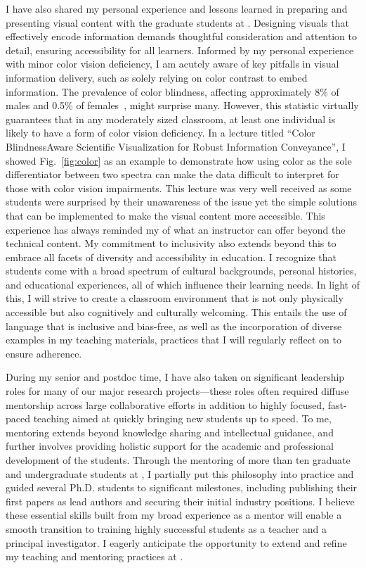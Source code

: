 I have also shared my personal experience and lessons learned in preparing and presenting visual content with the graduate students at \mySchoolShort{}. Designing visuals that effectively encode information demands thoughtful consideration and attention to detail, ensuring accessibility for all learners. Informed by my personal experience with minor color vision deficiency, I am acutely aware of key pitfalls in visual information delivery, such as solely relying on color contrast to embed information. The prevalence of color blindness, affecting approximately 8\% of males and 0.5\% of females~\cite{TypesColourBlindness}, might surprise many. However, this statistic virtually guarantees that in any moderately sized classroom, at least one individual is likely to have a form of color vision deficiency. In a lecture titled ``Color Blindness\textendash{}Aware Scientific Visualization for Robust Information Conveyance'', I showed Fig.~\ref{fig:color} as an example to demonstrate how using color as the sole differentiator between two spectra can make the data difficult to interpret for those with color vision impairments. This lecture was very well received as some students were surprised by their unawareness of the issue yet the simple solutions that can be implemented to make the visual content more accessible. This experience has always reminded my of what an instructor can offer beyond the technical content. My commitment to inclusivity also extends beyond this to embrace all facets of diversity and accessibility in education. I recognize that students come with a broad spectrum of cultural backgrounds, personal histories, and educational experiences, all of which influence their learning needs. In light of this, I will strive to create a classroom environment that is not only physically accessible but also cognitively and culturally welcoming. This entails the use of language that is inclusive and bias-free, as well as the incorporation of diverse examples in my teaching materials, practices that I will regularly reflect on to ensure adherence.

During my senior \myDegree{} and postdoc time, I have also taken on significant leadership roles for many of our major research projects—these roles often required diffuse mentorship across large collaborative efforts in addition to highly focused, fast-paced teaching aimed at quickly bringing new students up to speed. To me, mentoring extends beyond knowledge sharing and intellectual guidance, and further involves providing holistic support for
the academic and professional development of the students. Through the mentoring of more than ten graduate and undergraduate students at \mySchoolShort{}, I partially put this philosophy into practice and guided several Ph.D. students to significant milestones, including publishing their first papers as lead authors and securing their initial industry positions. I believe these essential skills built from my broad experience as a mentor will enable a
smooth transition to training highly successful students as a teacher and a principal investigator. I eagerly anticipate the opportunity to extend and refine my teaching and mentoring practices at \appSchoolDeptShort{}.

